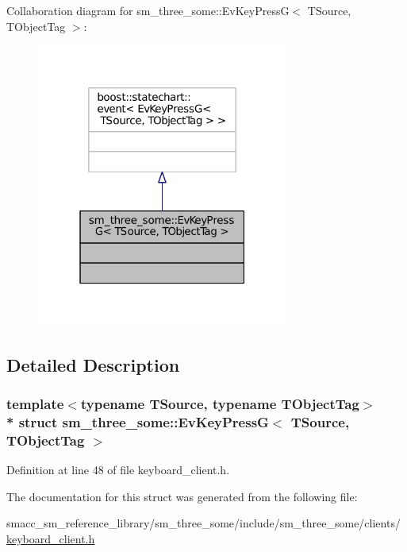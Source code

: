 Collaboration diagram for sm\+\_\+three\+\_\+some\+:\+:Ev\+Key\+PressG$<$ T\+Source, T\+Object\+Tag $>$\+:
\nopagebreak
\begin{figure}[H]
\begin{center}
\leavevmode
\includegraphics[width=235pt]{structsm__three__some_1_1EvKeyPressG__coll__graph}
\end{center}
\end{figure}


\subsection{Detailed Description}
\subsubsection*{template$<$typename T\+Source, typename T\+Object\+Tag$>$\\*
struct sm\+\_\+three\+\_\+some\+::\+Ev\+Key\+Press\+G$<$ T\+Source, T\+Object\+Tag $>$}



Definition at line 48 of file keyboard\+\_\+client.\+h.



The documentation for this struct was generated from the following file\+:\begin{DoxyCompactItemize}
\item 
smacc\+\_\+sm\+\_\+reference\+\_\+library/sm\+\_\+three\+\_\+some/include/sm\+\_\+three\+\_\+some/clients/\hyperlink{keyboard__client_8h}{keyboard\+\_\+client.\+h}\end{DoxyCompactItemize}
